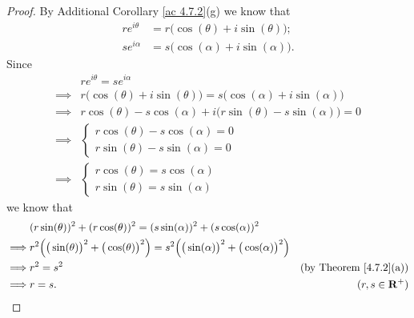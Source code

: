 \begin{proof}
    By Additional Corollary \ref{ac 4.7.2}(g) we know that
    \begin{align*}
        r e^{i \theta} & = r \big(\cos(\theta) + i \sin(\theta)\big); \\
        s e^{i \alpha} & = s \big(\cos(\alpha) + i \sin(\alpha)\big).
    \end{align*}
    Since
    \begin{align*}
                 & r e^{i \theta} = s e^{i \alpha}                                                       \\
        \implies & r \big(\cos(\theta) + i \sin(\theta)\big) = s \big(\cos(\alpha) + i \sin(\alpha)\big) \\
        \implies & r \cos(\theta) - s \cos(\alpha) + i \big(r \sin(\theta) - s \sin(\alpha)\big) = 0     \\
        \implies & \begin{cases}
                       r \cos(\theta) - s \cos(\alpha) = 0 \\
                       r \sin(\theta) - s \sin(\alpha) = 0
                   \end{cases}                                                   \\
        \implies & \begin{cases}
                       r \cos(\theta) = s \cos(\alpha) \\
                       r \sin(\theta) = s \sin(\alpha)
                   \end{cases}
    \end{align*}
    we know that
    \begin{align*}
                 & (r \sin(\theta))^2 + (r \cos(\theta))^2 = (s \sin(\alpha))^2 + (s \cos(\alpha))^2                                                                                          \\
        \implies & r^2 \Big(\big(\sin(\theta)\big)^2 + \big(\cos(\theta)\big)^2\Big) = s^2 \Big(\big(\sin(\alpha)\big)^2 + \big(\cos(\alpha)\big)^2\Big)                                      \\
        \implies & r^2 = s^2                                                                                                                             & \text{(by Theorem \ref{4.7.2}(a))} \\
        \implies & r = s.                                                                                                                                & (r, s \in \mathbf{R}^+)

\end{align*}
\end{proof}
